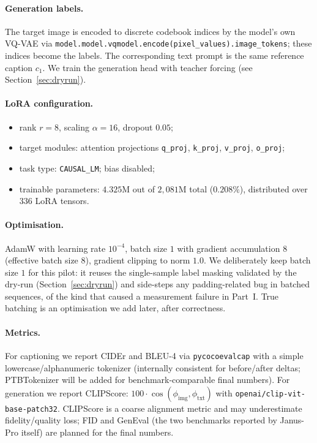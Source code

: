 \paragraph{Generation labels.} The target image is encoded to discrete
codebook indices by the model's own VQ-VAE via
\texttt{model.model.vqmodel.encode(pixel\_values).image\_tokens}; these indices
become the labels. The corresponding text prompt is the same reference caption
$c_1$. We train the generation head with teacher forcing (see
Section~\ref{sec:dryrun}).

\paragraph{LoRA configuration.}
\begin{itemize}
    \item rank $r=8$, scaling $\alpha=16$, dropout $0.05$;
    \item target modules: attention projections \texttt{q\_proj}, \texttt{k\_proj},
          \texttt{v\_proj}, \texttt{o\_proj};
    \item task type: \texttt{CAUSAL\_LM}; bias disabled;
    \item trainable parameters: $4.325$M out of $2{,}081$M total ($0.208\%$),
          distributed over $336$ LoRA tensors.
\end{itemize}

\paragraph{Optimisation.} AdamW with learning rate $10^{-4}$, batch size $1$
with gradient accumulation $8$ (effective batch size $8$), gradient clipping
to norm $1.0$. We deliberately keep batch size $1$ for this pilot: it reuses
the single-sample label masking validated by the dry-run (Section~\ref{sec:dryrun})
and side-steps any padding-related bug in batched sequences, of the kind that
caused a measurement failure in Part~I. True batching is an optimisation we
add later, after correctness.

\paragraph{Metrics.} For captioning we report CIDEr and BLEU-4 via
\texttt{pycocoevalcap} with a simple lowercase/alphanumeric tokenizer
(internally consistent for before/after deltas; PTBTokenizer will be added
for benchmark-comparable final numbers). For generation we report CLIPScore:
$100\cdot\cos(\phi_\text{img}, \phi_\text{txt})$ with
\texttt{openai/clip-vit-base-patch32}. CLIPScore is a coarse alignment metric
and may underestimate fidelity/quality loss; FID and GenEval (the two
benchmarks reported by Janus-Pro itself) are planned for the final numbers.

